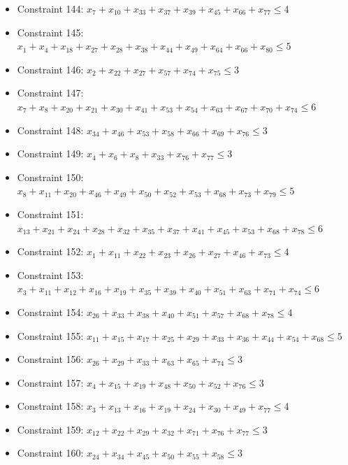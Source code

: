 \documentclass[11pt]{article}
\begin{document}
\begin{itemize}
\item Constraint 144: $x_{7} + x_{10} + x_{33} + x_{37} + x_{39} + x_{45} + x_{66} + x_{77} \le 4$
\item Constraint 145: $x_{1} + x_{4} + x_{18} + x_{27} + x_{28} + x_{38} + x_{44} + x_{49} + x_{64} + x_{66} + x_{80} \le 5$
\item Constraint 146: $x_{2} + x_{22} + x_{27} + x_{57} + x_{74} + x_{75} \le 3$
\item Constraint 147: $x_{7} + x_{8} + x_{20} + x_{21} + x_{30} + x_{41} + x_{53} + x_{54} + x_{63} + x_{67} + x_{70} + x_{74} \le 6$
\item Constraint 148: $x_{34} + x_{46} + x_{53} + x_{58} + x_{66} + x_{69} + x_{76} \le 3$
\item Constraint 149: $x_{4} + x_{6} + x_{8} + x_{33} + x_{76} + x_{77} \le 3$
\item Constraint 150: $x_{8} + x_{11} + x_{20} + x_{46} + x_{49} + x_{50} + x_{52} + x_{53} + x_{68} + x_{73} + x_{79} \le 5$
\item Constraint 151: $x_{13} + x_{21} + x_{24} + x_{28} + x_{32} + x_{35} + x_{37} + x_{41} + x_{45} + x_{53} + x_{68} + x_{78} \le 6$
\item Constraint 152: $x_{1} + x_{11} + x_{22} + x_{23} + x_{26} + x_{27} + x_{46} + x_{73} \le 4$
\item Constraint 153: $x_{3} + x_{11} + x_{12} + x_{16} + x_{19} + x_{35} + x_{39} + x_{40} + x_{51} + x_{63} + x_{71} + x_{74} \le 6$
\item Constraint 154: $x_{26} + x_{33} + x_{38} + x_{40} + x_{51} + x_{57} + x_{68} + x_{78} \le 4$
\item Constraint 155: $x_{11} + x_{15} + x_{17} + x_{25} + x_{29} + x_{33} + x_{36} + x_{44} + x_{54} + x_{68} \le 5$
\item Constraint 156: $x_{26} + x_{29} + x_{33} + x_{63} + x_{65} + x_{74} \le 3$
\item Constraint 157: $x_{4} + x_{15} + x_{19} + x_{48} + x_{50} + x_{52} + x_{76} \le 3$
\item Constraint 158: $x_{3} + x_{13} + x_{16} + x_{19} + x_{24} + x_{30} + x_{49} + x_{77} \le 4$
\item Constraint 159: $x_{12} + x_{22} + x_{29} + x_{32} + x_{71} + x_{76} + x_{77} \le 3$
\item Constraint 160: $x_{24} + x_{34} + x_{45} + x_{50} + x_{55} + x_{58} \le 3$
\end{itemize}
\end{document}
